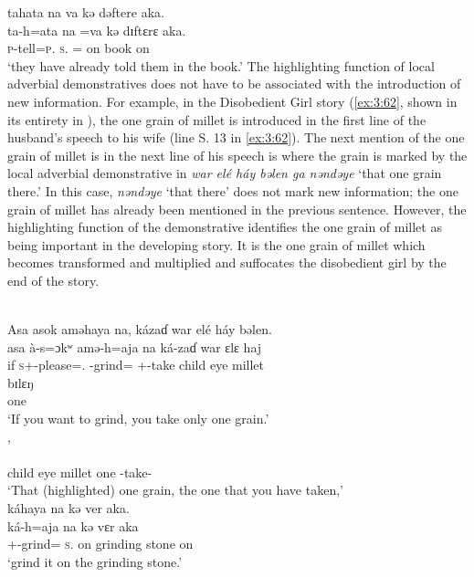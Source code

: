 tahata  na  va  kə dəftere  aka.\\
\gll ta-h=ata        na  =va   kə   dɪftɛrɛ  aka. \\
   \textsc{p}-tell=\textsc{p}.{\IO}    \textsc{s}.{\DO}  ={\PRF}   on  book  on\\
\glt ‘they have already told them in the book.’ 
\z
\largerpage
The highlighting function of local adverbial demonstratives does not have to be associated with the introduction of new information. For example, in the Disobedient Girl story (\ref{ex:3:62}, shown in its entirety in ), the one grain of millet is introduced in the first line of the husband’s speech to his wife (line S. 13 in \ref{ex:3:62}). The next mention of the one grain of millet is in the next line of his speech is where the grain is marked by the local adverbial demonstrative in \textit{war elé háy bəlen ga nəndəye} ‘that one grain there.’ In this case, \textit{nəndəye} ‘that there’ does not mark new information; the one grain of millet has already been mentioned in the previous sentence. However, the highlighting function of the demonstrative identifies the one grain of millet as being important in the developing story. It is the one grain of millet which becomes transformed and multiplied and suffocates the disobedient girl by the end of the story. 

\ea \label{ex:3:62}\\
Asa  asok aməhaya  na,  kázaɗ   war  elé  háy  bəlen.\\
\gll  asa  à-s=ɔkʷ  amə-h=aja        na   ká-zaɗ              war     ɛlɛ      haj   \\
      if \textsc{s}+{\PFV}-please={\twoS}.{\IO} {\DEP}-grind={\PLU} {\PSP} {\twoS}+{\IFV}-take  child  eye  millet \\
      
      \medskip
\gll bɪlɛŋ\\
     one\\
\glt  ‘If you want to grind, you take only one grain.’\\
,\\
\\
     child eye millet  one   {\ADJ}   {\DEM}        {\twoS}                {\DEP}-take-{\CL}   {\PSP}\\
\glt ‘That (highlighted) one grain, the one that you have taken,’\\
\medskip
káhaya  na  kə  ver  aka.\\
\gll ká-h=aja     na       kə       vɛr        aka\\
{\twoS}+{\IFV}-grind={\PLU}  \textsc{s}.{\DO}  on   {grinding stone}  on\\
\glt ‘grind it on the grinding stone.’
\z

